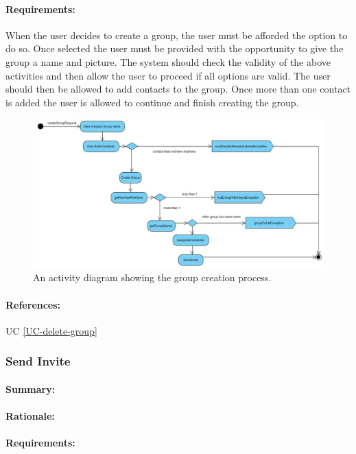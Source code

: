 \documentclass[11pt]{article}
\begin{document}
\paragraph{Requirements:} When the user decides to create a group, the user must be afforded the option to do so. Once selected the user must be provided with the opportunity to give the group a name and picture. The system should check the validity of the above activities and then allow the user to proceed if all options are valid. The user should then be allowed to add contacts to the group. Once more than one contact is added the user is allowed to continue and finish creating the group.
\begin{figure}[H]
\centering
\includegraphics[width=5in]{./images/process-create.jpg}
\caption[Create Group Activity Diagram]{An activity diagram showing the group creation process.}
\label{FR-figure-create-group}
\end{figure}
\paragraph{References:} UC \ref{UC-delete-group}

\subsubsection{Send Invite} \label{FR-invite}
\paragraph{Summary:}
\paragraph{Rationale:}
\paragraph{Requirements:}
\end{document}
